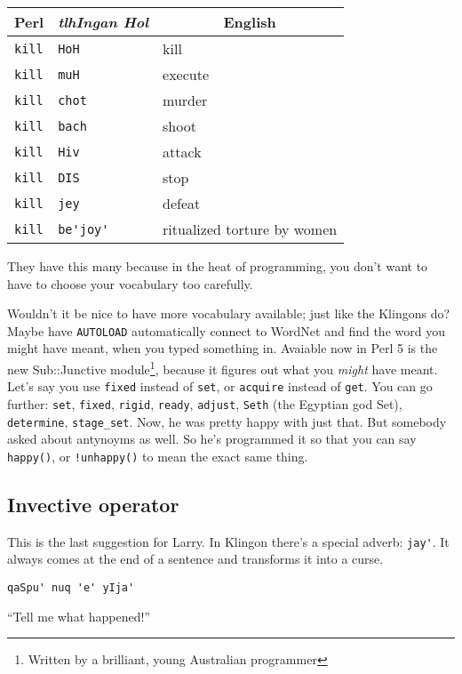 \documentclass{article}
\begin{document}
\begin{center}
\begin{tabular}{l|l|l}
\multicolumn{1}{c|}{Perl} & \multicolumn{1}{c|}{\it tlhIngan Hol}
& \multicolumn{1}{c}{English}\\\hline
\verb"kill" & \verb"HoH" & kill\\
\verb"kill" & \verb"muH" & execute\\
\verb"kill" & \verb"chot" & murder\\
\verb"kill" & \verb"bach" & shoot\\
\verb"kill" & \verb"Hiv" & attack\\
\verb"kill" & \verb"DIS" & stop\\
\verb"kill" & \verb"jey" & defeat\\
\verb"kill" & \verb"be'joy'" & ritualized torture by women\footnotemark
\end{tabular}
\end{center}
They have this many because in the heat of programming, you don't want 
to have to choose your vocabulary too carefully.

Wouldn't it be nice to have more vocabulary
available; just like the Klingons do?  Maybe have \verb'AUTOLOAD'
automatically connect to WordNet and find the word you might have meant,
when you typed something in.  Avaiable now in Perl 5 is the new
Sub::Junctive module\footnote{Written by a brilliant, young Australian
programmer}, because it figures out what you \emph{might} have meant.
Let's say you use \verb'fixed' instead of \verb'set', or \verb'acquire'
instead of \verb'get'.  You can go further: \verb'set', \verb'fixed',
\verb'rigid', \verb'ready', \verb'adjust', \verb'Seth' (the Egyptian god
Set), \verb'determine', \verb'stage_set'.  Now, he was pretty happy
with just that.  But somebody asked about antynoyms as well.  
So he's programmed it so that you can say \verb'happy()', or
\verb'!unhappy()' to mean the exact same thing.

\subsection{Invective operator}
This is the last suggestion for Larry.  In Klingon there's a special 
adverb:
\verb"jay'".  It always comes at the end of a sentence and transforms 
it into a
curse.

\verb"qaSpu' nuq 'e' yIja'" 

\hspace{\parindent}``Tell me what happened!''
\end{document}
